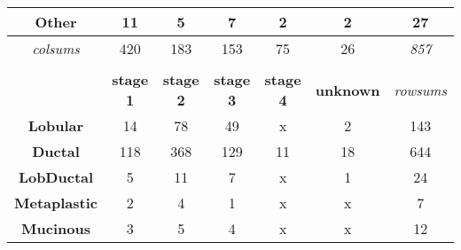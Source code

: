 \begin{table}[!h]
\begin{tabular}{ccccccc}
                \multicolumn{1}{c|}{\textbf{Other}} & \multicolumn{1}{c|}{11} & \multicolumn{1}{c|}{5} & \multicolumn{1}{c|}{7} & \multicolumn{1}{c|}{2} & \multicolumn{1}{c|}{2} & \multicolumn{1}{c|}{{\color[HTML]{656565} 27}} \\ \hline
                \multicolumn{1}{c|}{{\color[HTML]{9B9B9B} \textit{colsums}}} & \multicolumn{1}{c|}{{\color[HTML]{656565} 420}} & \multicolumn{1}{c|}{{\color[HTML]{656565} 183}} & \multicolumn{1}{c|}{{\color[HTML]{656565} 153}} & \multicolumn{1}{c|}{{\color[HTML]{656565} 75}} & \multicolumn{1}{c|}{{\color[HTML]{656565} 26}} & \multicolumn{1}{c|}{\textit{857}} \\ \cline{2-7} 
                \multicolumn{1}{l}{} & \multicolumn{1}{l}{} & \multicolumn{1}{l}{} & \multicolumn{1}{l}{} & \multicolumn{1}{l}{} & \multicolumn{1}{l}{} & \multicolumn{1}{l}{} \\
                \multicolumn{1}{c|}{} & \multicolumn{1}{c|}{\textbf{stage 1}} & \multicolumn{1}{c|}{\textbf{stage 2}} & \multicolumn{1}{c|}{\textbf{stage 3}} & \multicolumn{1}{c|}{\textbf{stage 4}} & \multicolumn{1}{c|}{\textbf{unknown}} & {\color[HTML]{9B9B9B} \textit{rowsums}} \\ \hline
                \multicolumn{1}{c|}{\textbf{Lobular}} & \multicolumn{1}{c|}{14} & \multicolumn{1}{c|}{78} & \multicolumn{1}{c|}{49} & \multicolumn{1}{c|}{{\color[HTML]{656565} x}} & \multicolumn{1}{c|}{2} & \multicolumn{1}{c|}{{\color[HTML]{656565} 143}} \\ \hline
                \multicolumn{1}{c|}{\textbf{Ductal}} & \multicolumn{1}{c|}{118} & \multicolumn{1}{c|}{368} & \multicolumn{1}{c|}{129} & \multicolumn{1}{c|}{11} & \multicolumn{1}{c|}{18} & \multicolumn{1}{c|}{{\color[HTML]{656565} 644}} \\ \hline
                \multicolumn{1}{c|}{\textbf{LobDuctal}} & \multicolumn{1}{c|}{5} & \multicolumn{1}{c|}{11} & \multicolumn{1}{c|}{7} & \multicolumn{1}{c|}{{\color[HTML]{656565} x}} & \multicolumn{1}{c|}{1} & \multicolumn{1}{c|}{{\color[HTML]{656565} 24}} \\ \hline
                \multicolumn{1}{c|}{\textbf{Metaplastic}} & \multicolumn{1}{c|}{2} & \multicolumn{1}{c|}{4} & \multicolumn{1}{c|}{1} & \multicolumn{1}{c|}{{\color[HTML]{656565} x}} & \multicolumn{1}{c|}{{\color[HTML]{656565} x}} & \multicolumn{1}{c|}{{\color[HTML]{656565} 7}} \\ \hline
                \multicolumn{1}{c|}{\textbf{Mucinous}} & \multicolumn{1}{c|}{3} & \multicolumn{1}{c|}{5} & \multicolumn{1}{c|}{4} & \multicolumn{1}{c|}{{\color[HTML]{656565} x}} & \multicolumn{1}{c|}{{\color[HTML]{656565} x}} & \multicolumn{1}{c|}{{\color[HTML]{656565} 12}} \\ \hline

\end{tabular}
\end{table}
